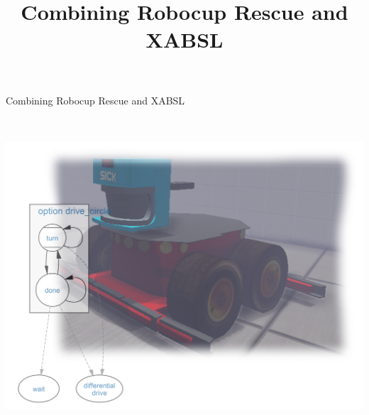 \title{Combining Robocup Rescue and XABSL}
\onecolumn
\thispagestyle{empty}
\vspace*{2cm}
\begin{center}
\begin{Huge} 
Combining Robocup Rescue and XABSL\\
\end{Huge}
\vspace{.5cm}
\begin{LARGE}
\color{\sectionColor}{Maarten P. de Waard}\\
\end{LARGE}
\vspace{3cm}
\includegraphics[width=\textwidth]{title_page/titlePageImage.jpg}
\end{center}



